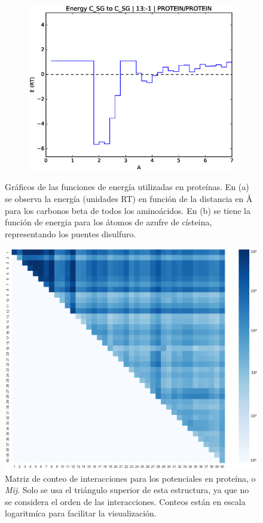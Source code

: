 \begin{figure}[p]
\begin{subfigure}{.8\textwidth}
\centering
\includegraphics[width=\textwidth]{figures/prot_pot/eps_graphs/sh2sh.eps}
\caption{}
\end{subfigure}
\caption[Ejemplos de funciones de energía en proteínas]{Gráficos de las funciones de energía utilizadas en proteínas. 
En (a) se observa la energía (unidades RT) en función de la distancia en \si{\angstrom} para los carbonos beta de todos los aminoácidos. 
En (b) se tiene la función de energia para los átomos de azufre de císteina, representando los puentes disulfuro.}
\label{fig:energy1}
\end{figure}

\begin{figure}[p]
\includegraphics[width=\textwidth]{figures/prot_pot/mij.png}
\caption[Cálculo de $\sigma$]{Matriz de conteo de interacciones para los potenciales en proteína, o \textit{Mij}. 
Solo se usa el triángulo superior de esta estructura, ya que no se considera el orden de las interacciones. 
Conteos están en escala logaritmíca para facilitar la visualización.}
\label{fig:mij}
\end{figure}

